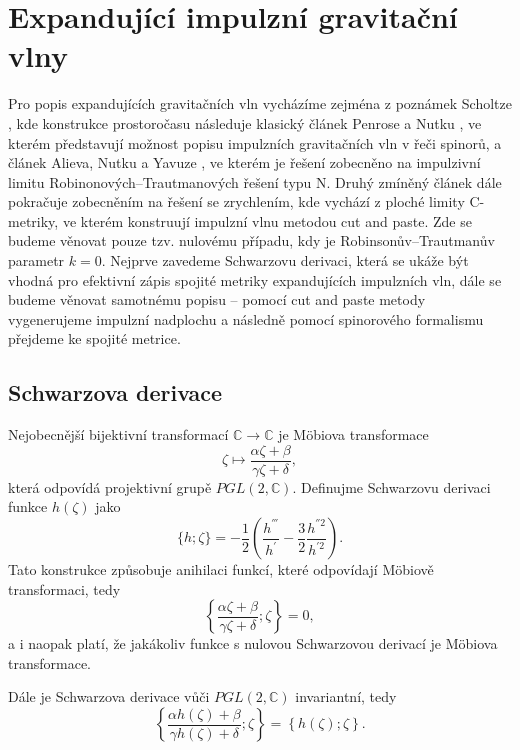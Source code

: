 \section{Expandující impulzní gravitační vlny}
Pro popis expandujících gravitačních vln vycházíme zejména z  poznámek Scholtze \cite{scholtz_notes}, kde konstrukce prostoročasu následuje klasický článek
Penrose a Nutku \cite{PenroseNutku1992}, ve kterém představují možnost popisu impulzních gravitačních vln v řeči spinorů, a článek Alieva, Nutku a Yavuze \cite{Aliev2001},
ve kterém je řešení zobecněno na impulzivní limitu Robinonových--Trautmanových řešení typu N.
Druhý zmíněný článek dále pokračuje zobecněním na řešení se zrychlením, kde vychází z ploché limity C-metriky, ve kterém konstruují impulzní vlnu metodou cut and paste.
Zde se budeme věnovat pouze tzv. nulovému případu, kdy je Robinsonův--Trautmanův parametr $k=0$.
Nejprve zavedeme Schwarzovu derivaci, která se ukáže být vhodná pro efektivní zápis spojité metriky expandujících impulzních vln,
dále se budeme věnovat samotnému popisu -- pomocí cut and paste metody vygenerujeme impulzní nadplochu a následně pomocí spinorového
formalismu přejdeme ke spojité metrice.
\subsection{Schwarzova derivace}
Nejobecnější bijektivní transformací $\mathbb{C} \to \mathbb{C}$ je Möbiova transformace
\begin{equation}
    \zeta \mapsto \frac{\alpha \zeta + \beta}{\gamma \zeta + \delta},
\end{equation}
která odpovídá projektivní grupě $PGL(2, \mathbb{C})$. Definujme Schwarzovu derivaci funkce $h(\zeta)$ jako
\begin{equation}
    \{h; \zeta\} = -\frac{1}{2}\left(\frac{h^{'''}}{h^{'}} - \frac{3}{2} \frac{h^{''2}}{h^{'2}}\right).
\end{equation}
Tato konstrukce způsobuje anihilaci funkcí, které odpovídají Möbiově transformaci, tedy
\begin{equation}
    \left\{ \frac{\alpha \zeta + \beta}{\gamma \zeta + \delta}; \zeta \right\} = 0,
\end{equation}
a i naopak platí, že jakákoliv funkce s nulovou Schwarzovou derivací je Möbiova transformace.

Dále je Schwarzova derivace vůči $PGL(2, \mathbb{C})$ invariantní, tedy
\begin{equation}
    \left\{ \frac{\alpha h(\zeta) + \beta}{\gamma h(\zeta) + \delta} ; \zeta \right\} = \left\{ h(\zeta); \zeta \right\}.
\end{equation}

